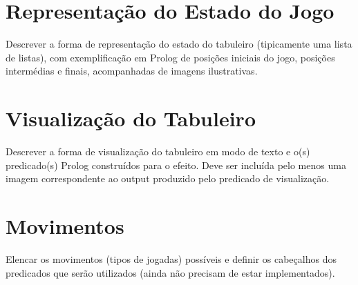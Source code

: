 \documentclass[a4paper]{article}
\begin{document}


\section{Representação do Estado do Jogo}

Descrever a forma de representação do estado do tabuleiro (tipicamente uma lista de listas), com exemplificação em Prolog de posições iniciais do jogo, posições intermédias e finais, acompanhadas de imagens ilustrativas.


\section{Visualização do Tabuleiro}

Descrever a forma de visualização do tabuleiro em modo de texto e o(s) predicado(s) Prolog construídos para o efeito.
Deve ser incluída pelo menos uma imagem correspondente ao output produzido pelo predicado de visualização.


\section{Movimentos}

Elencar os movimentos (tipos de jogadas) possíveis e definir os cabeçalhos dos predicados que serão utilizados (ainda não precisam de estar implementados).
\end{document}
